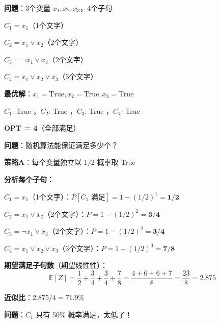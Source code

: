 \documentclass[12pt, a4paper]{ctexart}
\begin{document}
\begin{blackboard}

\textbf{问题}：3个变量 $x_1, x_2, x_3$，4个子句

$C_1 = x_1$（1个文字）

$C_2 = x_1 \lor x_2$（2个文字）

$C_3 = \neg x_1 \lor x_3$（2个文字）

$C_4 = x_1 \lor x_2 \lor x_3$（3个文字）

\textbf{最优解}：$x_1 = \text{True}, x_2 = \text{True}, x_3 = \text{True}$

$C_1$: True \checkmark，$C_2$: True \checkmark，$C_3$: True \checkmark，$C_4$: True \checkmark

\textbf{OPT = 4}（全部满足）

\textbf{问题}：随机算法能保证满足多少个？

\end{blackboard}

\begin{blackboard}

\textbf{策略A}：每个变量独立以 $1/2$ 概率取 True

\textbf{分析每个子句}：

$C_1 = x_1$（1个文字）：$P[C_1 \text{ 满足}] = 1 - (1/2)^1 = \mathbf{1/2}$

$C_2 = x_1 \lor x_2$（2个文字）：$P = 1 - (1/2)^2 = \mathbf{3/4}$

$C_3 = \neg x_1 \lor x_3$（2个文字）：$P = 1 - (1/2)^2 = \mathbf{3/4}$

$C_4 = x_1 \lor x_2 \lor x_3$（3个文字）：$P = 1 - (1/2)^3 = \mathbf{7/8}$

\textbf{期望满足子句数}（期望线性性）：
\[
\mathbb{E}[Z] = \frac{1}{2} + \frac{3}{4} + \frac{3}{4} + \frac{7}{8} = \frac{4 + 6 + 6 + 7}{8} = \frac{23}{8} = \mathbf{2.875}
\]

\textbf{近似比}：$2.875 / 4 = 71.9\%$

\textbf{问题}：$C_1$ 只有 50\% 概率满足，太低了！

\end{blackboard}
\end{document}
